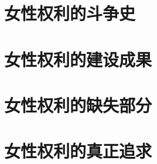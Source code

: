 \documentclass[t, 10pt, aspectratio=169]{ctexbeamer}
\begin{document}
    
    \section{女性权利的斗争史}
    \section{女性权利的建设成果}
    \section{女性权利的缺失部分}
    \section{女性权利的真正追求}
    
\end{document}
